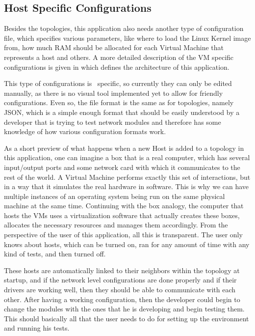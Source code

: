 \subsection{Host Specific Configurations}
\label{sub-sec:host-specific-configurations}

Besides the topologies, this application also needs another type of configuration file, which specifies various parameters, like where to load the Linux Kernel image from, how much RAM should be allocated for each Virtual Machine that represents a host and others.
A more detailed description of the VM specific configurations is given in  which defines the architecture of this application.

This type of configurations is \project\ specific, so currently they can only be edited manually, as there is no visual tool implemented yet to allow for friendly configurations.
Even so, the file format is the same as for topologies, namely JSON, which is a simple enough format that should be easily understood by a developer that is trying to test network modules and therefore has some knowledge of how various configuration formats work.

As a short preview of what happens when a new Host is added to a topology in this application, one can imagine a box that is a real computer, which has several input/output ports and some network card with which it communicates to the rest of the world.
A Virtual Machine performs exactly this set of interactions, but in a way that it simulates the real hardware in software.
This is why we can have multiple instances of an operating system being run on the same physical machine at the same time.
Continuing with the box analogy, the computer that hosts the VMs uses a virtualization software that actually creates these boxes, allocates the necessary resources and manages them accordingly.
From the perspective of the user of this application, all this is transparent.
The user only knows about hosts, which can be turned on, ran for any amount of time with any kind of tests, and then turned off.

These hosts are automatically linked to their neighbors within the topology at startup, and if the network level configurations are done properly and if their drivers are working well, then they should be able to communicate with each other.
After having a working configuration, then the developer could begin to change the modules with the ones that he is developing and begin testing them.
This should basically all that the user needs to do for setting up the environment and running his tests.
